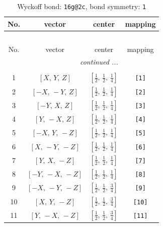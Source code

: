 \documentclass[fleqn,8pt]{jsarticle}
\begin{document}
\begin{longtable}{cccc}
\caption{Wyckoff bond: {\tt 16g@2c}, bond symmetry: {\tt 1}}
 \\
 \hline \hline
No. & vector & center & mapping \\ \hline \endfirsthead

\multicolumn{3}{l}{\tablename\ \thetable{}} \\
 \hline \hline
No. & vector & center & mapping \\ \hline \endhead

 \hline \hline
\multicolumn{3}{r}{\footnotesize\it continued ...} \\ \endfoot

 \hline \hline
\multicolumn{3}{r}{} \\ \endlastfoot

1 & $\left[ X,\, Y,\, Z \right]$ & $\left[ \frac{1}{2},\, \frac{1}{2},\, \frac{1}{4} \right]$ & {\tt [1]} \\ \hline
2 & $\left[ - X,\, - Y,\, Z \right]$ & $\left[ \frac{1}{2},\, \frac{1}{2},\, \frac{1}{4} \right]$ & {\tt [2]} \\ \hline
3 & $\left[ - Y,\, X,\, Z \right]$ & $\left[ \frac{1}{2},\, \frac{1}{2},\, \frac{1}{4} \right]$ & {\tt [3]} \\ \hline
4 & $\left[ Y,\, - X,\, Z \right]$ & $\left[ \frac{1}{2},\, \frac{1}{2},\, \frac{1}{4} \right]$ & {\tt [4]} \\ \hline
5 & $\left[ - X,\, Y,\, - Z \right]$ & $\left[ \frac{1}{2},\, \frac{1}{2},\, \frac{1}{4} \right]$ & {\tt [5]} \\ \hline
6 & $\left[ X,\, - Y,\, - Z \right]$ & $\left[ \frac{1}{2},\, \frac{1}{2},\, \frac{1}{4} \right]$ & {\tt [6]} \\ \hline
7 & $\left[ Y,\, X,\, - Z \right]$ & $\left[ \frac{1}{2},\, \frac{1}{2},\, \frac{1}{4} \right]$ & {\tt [7]} \\ \hline
8 & $\left[ - Y,\, - X,\, - Z \right]$ & $\left[ \frac{1}{2},\, \frac{1}{2},\, \frac{1}{4} \right]$ & {\tt [8]} \\ \hline
9 & $\left[ - X,\, - Y,\, - Z \right]$ & $\left[ \frac{1}{2},\, \frac{1}{2},\, \frac{3}{4} \right]$ & {\tt [9]} \\ \hline
10 & $\left[ X,\, Y,\, - Z \right]$ & $\left[ \frac{1}{2},\, \frac{1}{2},\, \frac{3}{4} \right]$ & {\tt [10]} \\ \hline
11 & $\left[ Y,\, - X,\, - Z \right]$ & $\left[ \frac{1}{2},\, \frac{1}{2},\, \frac{3}{4} \right]$ & {\tt [11]} \\ \hline

\end{longtable}
\end{document}

